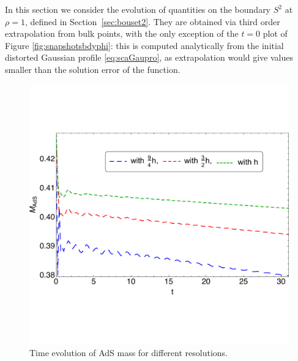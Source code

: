\documentclass[a4paper,11pt]{article}
\numberwithin{equation}{section}
\begin{document}
In this section we consider the evolution of quantities on the boundary $S^2$ at $\rho=1$, defined in Section~\ref{sec:bouset2}. They are obtained via third order extrapolation from bulk points, with the only exception of the $t=0$ plot of Figure \ref{fig:snapshotsbdyphi}: this is computed analytically from the initial distorted Gaussian profile \eqref{eq:scaGaupro}, as extrapolation would give values smaller than the solution error of the function. 

\begin{figure}[!h]
        \centering
        \includegraphics[width=4.5in,clip=true]{plots/timeseries/AdSmass/fullplotfillregtAdSmassallres.pdf}
\parbox{5.0in}{\caption{Time evolution of AdS mass for different resolutions.
        }\label{fig:AdSmass-crop}}
\end{figure}
\end{document}
